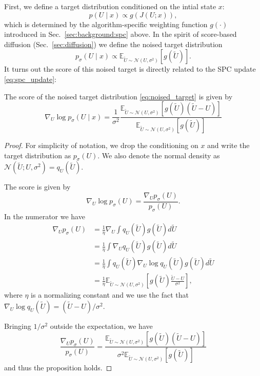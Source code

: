 \documentclass[letterpaper, 10 pt]{ieeeconf}
\begin{document}
First, we define a target distribution conditioned on the intial state $x$:
\begin{equation}
    p(U \mid x) \propto g(J(U; x)),
\end{equation}
which is determined by the algorithm-specific weighting function $g(\cdot)$ introduced in Sec.~\ref{sec:background:spc} above. In the spirit of score-based diffusion (Sec.~\ref{sec:diffusion}) we define the noised target distribution
\begin{equation}\label{eq:noised_target}
    p_\sigma(U \mid x) \propto \mathbb{E}_{\tilde{U} \sim \mathcal{N}(U, \sigma^2)}[g(\tilde{U})].
\end{equation}
It turns out the score of this noised target is directly related to the SPC update \eqref{eq:spc_update}:

\begin{proposition}
    The score of the noised target distribution \eqref{eq:noised_target} is given by
    \begin{equation}
        \nabla_U \log p_\sigma(U \mid x) = \frac{1}{\sigma^2} \frac{\mathbb{E}_{\tilde{U} \sim \mathcal{N}(U, \sigma^2)}\left[g(\tilde{U})(\tilde{U}-U)\right]}{\mathbb{E}_{\tilde{U} \sim \mathcal{N}(U, \sigma^2)}\left[g(\tilde{U})\right]}
    \end{equation}
\end{proposition}
\begin{proof}
    For simplicity of notation, we drop the conditioning on $x$ and write the target distribution as $p_\sigma(U)$. We also denote the normal density as $\mathcal{N}(\tilde{U}; U, \sigma^2) = q_U(\tilde{U})$.

    The score is given by
    \begin{equation}
        \nabla_U \log p_\sigma(U) = \frac{\nabla_U p_\sigma(U)}{p_\sigma(U)}.
    \end{equation}
    In the numerator we have
    \begin{align}
        \nabla_U p_\sigma(U) &= \frac{1}{\eta} \nabla_U \int q_U(\tilde{U})g(\tilde{U})d\tilde{U} \\
        &= \frac{1}{\eta} \int \nabla_U q_U(\tilde{U}) g(\tilde{U})d\tilde{U} \\
        &= \frac{1}{\eta} \int q_U(\tilde{U}) \nabla_U \log q_U(\tilde{U})g(\tilde{U})d\tilde{U} \\
        &= \frac{1}{\eta} \mathbb{E}_{\tilde{U} \sim \mathcal{N}(U, \sigma^2)}\left[{g(\tilde{U})\frac{\tilde{U} - U}{\sigma^2}}\right],
    \end{align}
    where $\eta$ is a normalizing constant and we use the fact that $\nabla_U \log q_U(\tilde{U}) = (\tilde{U} - U)/\sigma^2$.

    Bringing $1 / \sigma^2$ outside the expectation, we have
    \begin{equation}
        \frac{\nabla_U p_\sigma(U)}{p_\sigma(U)} = \frac{\mathbb{E}_{\tilde{U} \sim \mathcal{N}(U, \sigma^2)}\left[g(\tilde{U})(\tilde{U}-U)\right]}{\sigma^2\mathbb{E}_{\tilde{U} \sim \mathcal{N}(U, \sigma^2)}\left[g(\tilde{U})\right]}
    \end{equation}
    and thus the proposition holds.
\end{proof}
\end{document}
